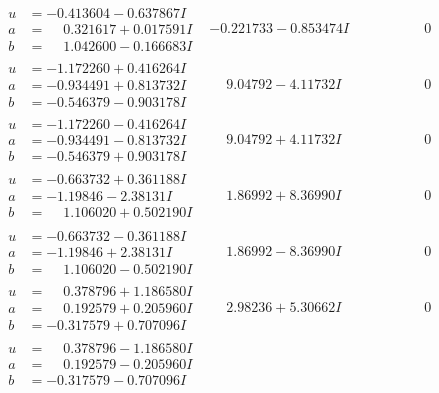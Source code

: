 \documentclass[1p]{elsarticle_modified}
\theoremstyle{definition}
\begin{document}
$$\begin{array}{c|c|c}
\begin{aligned}
u &= -0.413604 - 0.637867 I \\
a &= \phantom{-}0.321617 + 0.017591 I \\
b &= \phantom{-}1.042600 - 0.166683 I\end{aligned}
 & -0.221733 - 0.853474 I & \phantom{-0.000000 } 0 \\ \hline\begin{aligned}
u &= -1.172260 + 0.416264 I \\
a &= -0.934491 + 0.813732 I \\
b &= -0.546379 - 0.903178 I\end{aligned}
 & \phantom{-}9.04792 - 4.11732 I & \phantom{-0.000000 } 0 \\ \hline\begin{aligned}
u &= -1.172260 - 0.416264 I \\
a &= -0.934491 - 0.813732 I \\
b &= -0.546379 + 0.903178 I\end{aligned}
 & \phantom{-}9.04792 + 4.11732 I & \phantom{-0.000000 } 0 \\ \hline\begin{aligned}
u &= -0.663732 + 0.361188 I \\
a &= -1.19846 - 2.38131 I \\
b &= \phantom{-}1.106020 + 0.502190 I\end{aligned}
 & \phantom{-}1.86992 + 8.36990 I & \phantom{-0.000000 } 0 \\ \hline\begin{aligned}
u &= -0.663732 - 0.361188 I \\
a &= -1.19846 + 2.38131 I \\
b &= \phantom{-}1.106020 - 0.502190 I\end{aligned}
 & \phantom{-}1.86992 - 8.36990 I & \phantom{-0.000000 } 0 \\ \hline\begin{aligned}
u &= \phantom{-}0.378796 + 1.186580 I \\
a &= \phantom{-}0.192579 + 0.205960 I \\
b &= -0.317579 + 0.707096 I\end{aligned}
 & \phantom{-}2.98236 + 5.30662 I & \phantom{-0.000000 } 0 \\ \hline\begin{aligned}
u &= \phantom{-}0.378796 - 1.186580 I \\
a &= \phantom{-}0.192579 - 0.205960 I \\
b &= -0.317579 - 0.707096 I\end{aligned}

\end{array}$$
\end{document}

